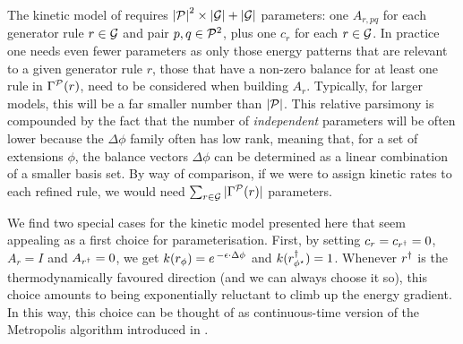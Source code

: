 
The kinetic model of  requires
$\left\lvert \mathcal{P} \right\rvert^2 \times \left\lvert \mathcal{G} \right\rvert + \left\lvert \mathcal{G} \right\rvert$
parameters: %
one $A_{r,pq}$ for each generator rule $r \in \mathcal{G}$
and pair $p, q \in \mathcal{P}^2$,
plus one $c_r$ for each $r \in \mathcal{G}$.
In practice one needs even fewer parameters
as only those energy patterns that are relevant
to a given generator rule $r$,
\ie those that have a non-zero balance
for at least one rule in $\Gamma^{\mathcal{P}}(r)$,
need to be considered when building $A_r$.
Typically, for larger models,
this will be a far smaller number than $\left\lvert \mathcal{P} \right\rvert$.
This relative parsimony is compounded by the fact that
the number of \emph{independent} parameters will be often lower
because the $\Delta\phi$ family often has low rank,
meaning that, for a set of extensions $\phi$,
the balance vectors $\Delta\phi$ can be determined as
a linear combination of a smaller basis set.
By way of comparison,
if we were to assign kinetic rates to each refined rule,
we would need $\sum_{r \in \mathcal{G}} |\Gamma^{\mathcal{P}}(r)|$ parameters.

We find two special cases for
the kinetic model presented here
that seem appealing as a first choice for parameterisation.
First, by setting $c_r = c_{r^\dagger} = 0$,
$A_r = I$ and $A_{r^\dagger} = 0$,
we get $k(r_\phi) = e^{\,-\epsilon \cdot \Delta\phi}$
and $k(r^\dagger_{\phi^\star}) = 1$.
Whenever $r^\dagger$ is the thermodynamically favoured direction
(and we can always choose it so),
this choice amounts to being exponentially reluctant
to climb up the energy gradient.
In this way,
this choice can be thought of as
continuous-time version of the
Metropolis algorithm introduced in .

